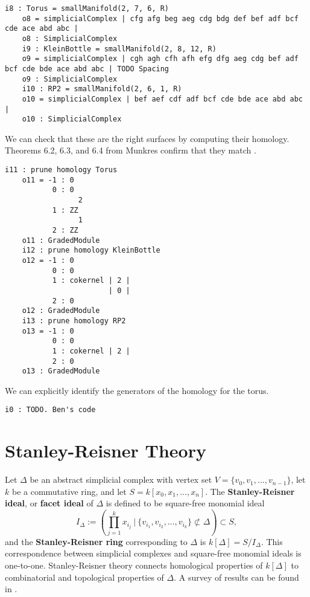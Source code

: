\documentclass[12pt,leqno]{amsart}
\theoremstyle{definition}
\newenvironment{example}
{\pushQED{\qed}\renewcommand{\qedsymbol}{$\diamond$}\examplex}
{\popQED\endexamplex}
\begin{document}
\begin{example}\label{example of using database}
  \begin{lstlisting}[basicstyle={\ttfamily \scriptsize}, xleftmargin=-23pt]
    i8 : Torus = smallManifold(2, 7, 6, R)
    o8 = simplicialComplex | cfg afg beg aeg cdg bdg def bef adf bcf cde ace abd abc |
    o8 : SimplicialComplex
    i9 : KleinBottle = smallManifold(2, 8, 12, R)
    o9 = simplicialComplex | cgh agh cfh afh efg dfg aeg cdg bef adf bcf cde bde ace abd abc | TODO Spacing
    o9 : SimplicialComplex
    i10 : RP2 = smallManifold(2, 6, 1, R)
    o10 = simplicialComplex | bef aef cdf adf bcf cde bde ace abd abc |
    o10 : SimplicialComplex
  \end{lstlisting}
  We can check that these are the right surfaces by computing their homology. Theorems 6.2, 6.3, and 6.4 from Munkres confirm that they match \cite{Munkres}.
  \begin{lstlisting}[basicstyle={\ttfamily \scriptsize}, xleftmargin=-23pt]
    i11 : prune homology Torus 
    o11 = -1 : 0  
           0 : 0  
                 2
           1 : ZZ
                 1
           2 : ZZ
    o11 : GradedModule
    i12 : prune homology KleinBottle
    o12 = -1 : 0             
           0 : 0             
           1 : cokernel | 2 |
                        | 0 |
           2 : 0             
    o12 : GradedModule
    i13 : prune homology RP2
    o13 = -1 : 0             
           0 : 0             
           1 : cokernel | 2 |
           2 : 0             
    o13 : GradedModule
  \end{lstlisting}
  We can explicitly identify the generators of the homology for the torus.
  \begin{lstlisting}[basicstyle={\ttfamily \scriptsize}, xleftmargin=-23pt]
    i0 : TODO. Ben's code
  \end{lstlisting}
\end{example}


\section{Stanley-Reisner Theory}

\noindent
Let $\Delta$ be an abstract simplicial complex with vertex set $V = \{v_0,v_1,...,v_{n-1}\}$, let $k$ be a commutative ring, and let $S = k[x_0,x_1,...,x_n]$. The \textbf{Stanley-Reisner ideal}, or \textbf{facet ideal} of $\Delta$ is defined to be square-free monomial ideal
%
\begin{displaymath}
  I_\Delta := \left( \prod_{j=1}^k x_{i_j} \ \bigg\vert \ \{ v_{i_1},v_{i_2},...,v_{i_k} \} \not \subset \Delta \right) \subset S,
\end{displaymath}
%
and the \textbf{Stanley-Reisner ring} corresponding to $\Delta$ is $k[\Delta] = S/I_\Delta$. This correspondence between simplicial complexes and square-free monomial ideals is one-to-one. Stanley-Reisner theory connects homological properties of $k[\Delta]$ to combinatorial and topological properties of $\Delta$. A survey of results can be found in \cite{BH, Stanley, MS}.
\end{document}
